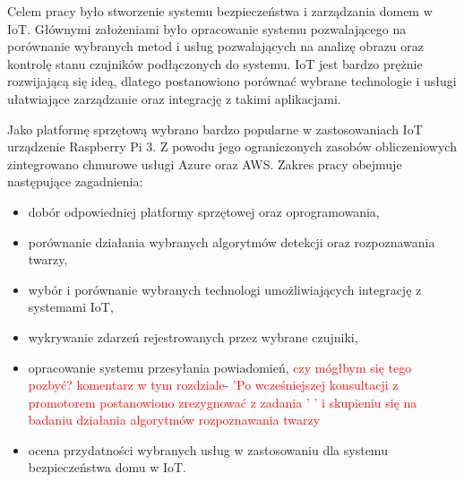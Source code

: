 Celem pracy było stworzenie systemu bezpieczeństwa i zarządzania domem w IoT. Głównymi założeniami było opracowanie systemu pozwalającego na porównanie wybranych metod i usług pozwalających na analizę obrazu oraz kontrolę stanu czujników podłączonych do systemu. IoT jest bardzo prężnie rozwijającą się ideą, dlatego postanowiono porównać wybrane technologie i usługi ułatwiające zarządzanie oraz integrację z takimi aplikacjami.

Jako platformę sprzętową wybrano bardzo popularne w zastosowaniach IoT urządzenie Raspberry Pi 3. Z powodu jego ograniczonych zasobów obliczeniowych zintegrowano chmurowe usługi Azure oraz AWS. Zakres pracy obejmuje następujące zagadnienia:
\begin{itemize}
\item dobór odpowiedniej platformy sprzętowej oraz oprogramowania,
\item porównanie działania wybranych algorytmów detekcji oraz rozpoznawania twarzy,
\item wybór i porównanie wybranych technologi umożliwiających integrację z systemami IoT,
\item wykrywanie zdarzeń rejestrowanych przez wybrane czujniki,
\item opracowanie systemu przesyłania powiadomień,  \textcolor{red}{czy mógłbym się tego pozbyć? komentarz w tym rozdziale- 'Po wcześniejszej konsultacji z promotorem postanowiono zrezygnować z zadania '    ' i skupieniu się na badaniu działania algorytmów rozpoznawania twarzy}
\item ocena przydatności wybranych usług w zastosowaniu dla systemu bezpieczeństwa domu w IoT.
\end{itemize}